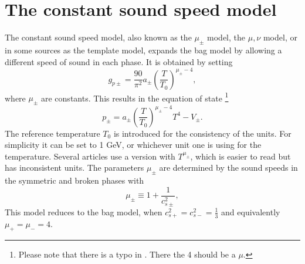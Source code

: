 \section{The constant sound speed model}
\label{const_cs}
The constant sound speed model, also known as the $\mu_\pm$ model, the $\mu, \nu$ model,
or in some sources as the template model,
expands the bag model by allowing a different speed of sound in each phase.
\cites{leitao_hydrodynamics_2015}{giese_2020}{giese_2021}
It is obtained by setting
\begin{equation}
g_{p\pm} = \frac{90}{\pi^2} a_\pm \left( \frac{T}{T_0} \right)^{\mu_\pm - 4},
\end{equation}
where $\mu_\pm$ are constants.
This results in the equation of state
\cites[eq. 15]{giese_2021}[eq. 38]{giese_2020}%
\footnote{Please note that there is a typo in \cite[eq. 15]{giese_2021}. There the 4 should be a $\mu$.}
\begin{equation}
p_\pm = a_\pm \left( \frac{T}{T_0} \right)^{\mu_\pm - 4} T^4 - V_\pm.
\end{equation}
The reference temperature $T_0$ is introduced for the consistency of the units.
For simplicity it can be set to 1 GeV, or whichever unit one is using for the temperature.
Several articles use a version with $T^{\mu_\pm}$, which is easier to read but has inconsistent units.
The parameters $\mu_\pm$ are determined by the sound speeds in the symmetric and broken phases with
\cites[eq. 16]{giese_2021}[eq. 39]{giese_2020}
\begin{equation}
\mu_\pm \equiv 1 + \frac{1}{c_{s\pm}^2},
\end{equation}
This model reduces to the bag model,
when $c_{s+}^2 = c_{s-}^2 = \frac{1}{3}$
and equivalently
$\mu_+ = \mu_- = 4$.

